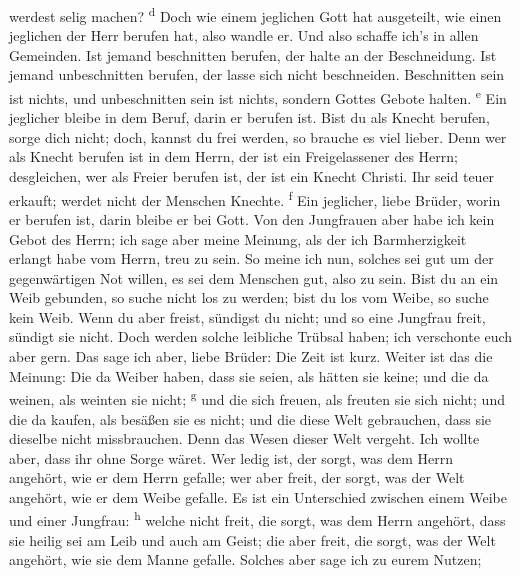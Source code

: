 werdest selig machen? \textsuperscript{d}  Doch wie einem
jeglichen Gott hat ausgeteilt, wie einen jeglichen der Herr berufen hat,
also wandle er. Und also schaffe ich's in allen Gemeinden.
 Ist jemand beschnitten berufen, der halte an der
Beschneidung. Ist jemand unbeschnitten berufen, der lasse sich nicht
beschneiden.  Beschnitten sein ist nichts, und
unbeschnitten sein ist nichts, sondern Gottes Gebote halten.
\textsuperscript{e}  Ein jeglicher bleibe in dem Beruf,
darin er berufen ist.  Bist du als Knecht berufen, sorge
dich nicht; doch, kannst du frei werden, so brauche es viel lieber.
 Denn wer als Knecht berufen ist in dem Herrn, der ist
ein Freigelassener des Herrn; desgleichen, wer als Freier berufen ist,
der ist ein Knecht Christi.  Ihr seid teuer erkauft;
werdet nicht der Menschen Knechte. \textsuperscript{f} 
Ein jeglicher, liebe Brüder, worin er berufen ist, darin bleibe er bei
Gott.  Von den Jungfrauen aber habe ich kein Gebot des
Herrn; ich sage aber meine Meinung, als der ich Barmherzigkeit erlangt
habe vom Herrn, treu zu sein.  So meine ich nun, solches
sei gut um der gegenwärtigen Not willen, es sei dem Menschen gut, also
zu sein.  Bist du an ein Weib gebunden, so suche nicht
los zu werden; bist du los vom Weibe, so suche kein Weib.
 Wenn du aber freist, sündigst du nicht; und so eine
Jungfrau freit, sündigt sie nicht. Doch werden solche leibliche Trübsal
haben; ich verschonte euch aber gern.  Das sage ich aber,
liebe Brüder: Die Zeit ist kurz. Weiter ist das die Meinung: Die da
Weiber haben, dass sie seien, als hätten sie keine; und die da weinen,
als weinten sie nicht; \textsuperscript{g}  und die sich
freuen, als freuten sie sich nicht; und die da kaufen, als besäßen sie
es nicht;  und die diese Welt gebrauchen, dass sie
dieselbe nicht missbrauchen. Denn das Wesen dieser Welt vergeht.
 Ich wollte aber, dass ihr ohne Sorge wäret. Wer ledig
ist, der sorgt, was dem Herrn angehört, wie er dem Herrn gefalle;
 wer aber freit, der sorgt, was der Welt angehört, wie er
dem Weibe gefalle. Es ist ein Unterschied zwischen einem Weibe und einer
Jungfrau: \textsuperscript{h}  welche nicht freit, die
sorgt, was dem Herrn angehört, dass sie heilig sei am Leib und auch am
Geist; die aber freit, die sorgt, was der Welt angehört, wie sie dem
Manne gefalle.  Solches aber sage ich zu eurem Nutzen;
